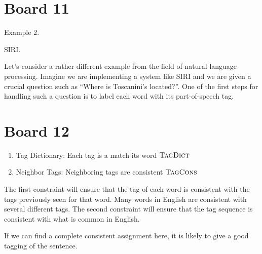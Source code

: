 \documentclass[10pt]{article}
\begin{document}

\section{Board 11}
Example 2.

SIRI. 

Let's consider a rather different example from the field of natural 
language processing. Imagine we are implementing a system like SIRI
and we are given a crucial question such as ``Where is Toscanini's located?''.
One of the first steps for handling such a question is to label each word 
with its part-of-speech tag. 


\section{Board 12}
\begin{enumerate}
\item Tag Dictionary: Each tag is a match its word $\mathrm{\textsc{TagDict}}$ 
\item Neighbor Tags: Neighboring tags are consistent $\mathrm{\textsc{TagCons}}$
\end{enumerate}

The first constraint will ensure that the tag of each word is consistent
with the tags previously seen for that word. Many words in English are consistent 
with several different tags.  The second constraint will ensure that the 
tag sequence is consistent with what is common in English.

If we can find a complete consistent assignment here, it is likely to
give a good tagging of the sentence.
\end{document}
